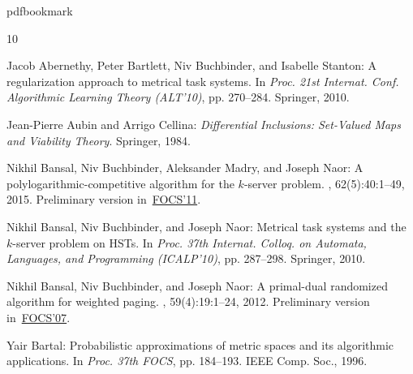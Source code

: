 \newcommand{\prelim}{Preliminary version in\ }\newcommand{\prelims}{Preliminary
  versions in\ }
\providecommand{\bibhead}[1]{}
\expandafter\ifx\csname pdfbookmark\endcsname\relax%
  \providecommand{\tocrefpdfbookmark}{}
\else\providecommand{\tocrefpdfbookmark}{%
   \hypertarget{tocreferences}{}%
   \pdfbookmark[1]{References}{tocreferences}}%
\fi

\tocrefpdfbookmark
\begin{thebibliography}{10}

\bibhead{ABBS10}
{\sc Jacob Abernethy, Peter Bartlett, Niv Buchbinder, and Isabelle Stanton}: A
  regularization approach to metrical task systems.
\newblock In {\em Proc. 21st Internat. Conf. Algorithmic Learning Theory
  (ALT'10)}, pp. 270--284. Springer, 2010.
\newblock [\epfmtdoi{10.1007/978-3-642-16108-7\_23}]

\bibhead{AC84}
{\sc Jean-Pierre Aubin and Arrigo Cellina}: {\em Differential Inclusions:
  Set-Valued Maps and Viability Theory}.
\newblock Springer, 1984.
\newblock [\epfmtdoi{10.1007/978-3-642-69512-4}]

\bibhead{BBMN15}
{\sc Nikhil Bansal, Niv Buchbinder, Aleksander Madry, and Joseph Naor}: A
  polylogarithmic-competitive algorithm for the {$k$}-server problem.
, 62(5):40:1--49, 2015.
\newblock \prelim \href{https://doi.org/10.1109/FOCS.2011.63}{FOCS'11}.

\bibhead{BBN10}
{\sc Nikhil Bansal, Niv Buchbinder, and Joseph Naor}: Metrical task systems and
  the $k$-server problem on {HSTs}.
\newblock In {\em Proc. 37th Internat. Colloq. on Automata, Languages, and
  Programming (ICALP'10)}, pp. 287--298. Springer, 2010.
\newblock [\epfmtdoi{10.1007/978-3-642-14165-2\_25}]

\bibhead{BBN12}
{\sc Nikhil Bansal, Niv Buchbinder, and Joseph Naor}: A primal-dual randomized
  algorithm for weighted paging.
, 59(4):19:1--24, 2012.
\newblock \prelim \href{https://doi.org/10.1109/FOCS.2007.43}{FOCS'07}.
\newblock [\epfmtdoi{10.1145/2339123.2339126}]

\bibhead{Bar96}
{\sc Yair Bartal}: Probabilistic approximations of metric spaces and its
  algorithmic applications.
\newblock In {\em Proc. 37th FOCS}, pp. 184--193. IEEE Comp. Soc., 1996.


\end{thebibliography}

